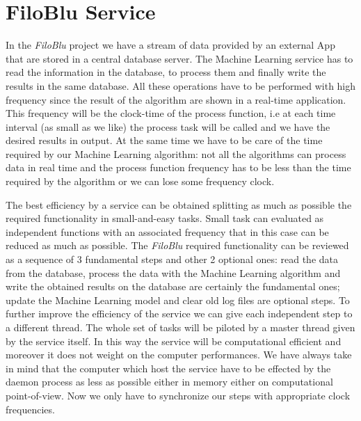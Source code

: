 \documentclass{standalone}
\begin{document}
\section*{FiloBlu Service}

In the \emph{FiloBlu} project we have a stream of data provided by an external App that are stored in a central database server.
The Machine Learning service has to read the information in the database, to process them and finally write the results in the same database.
All these operations have to be performed with high frequency since the result of the algorithm are shown in a real-time application.
This frequency will be the clock-time of the process function, i.e at each time interval (as small as we like) the process task will be called and we have the desired results in output.
At the same time we have to be care of the time required by our Machine Learning algorithm: not all the algorithms can process data in real time and the process function frequency has to be less than the time required by the algorithm or we can lose some frequency clock.

The best efficiency by a service can be obtained splitting as much as possible the required functionality in small-and-easy tasks.
Small task can evaluated as independent functions with an associated frequency that in this case can be reduced as much as possible.
The \emph{FiloBlu} required functionality can be reviewed as a sequence of 3 fundamental steps and other 2 optional ones: read the data from the database, process the data with the Machine Learning algorithm and write the obtained results on the database are certainly the fundamental ones; update the Machine Learning model and clear old log files are optional steps.
To further improve the efficiency of the service we can give each independent step to a different thread.
The whole set of tasks will be piloted by a master thread given by the service itself.
In this way the service will be computational efficient and moreover it does not weight on the computer performances.
We have always take in mind that the computer which host the service have to be effected by the daemon process as less as possible either in memory either on computational point-of-view.
Now we only have to synchronize our steps with appropriate clock frequencies.
\end{document}
